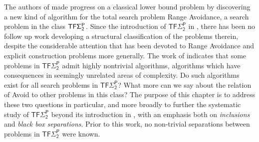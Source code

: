 The authors of \cite{CHR,Li} made progress on a classical lower bound problem by discovering a new kind of algorithm for the total search problem Range Avoidance, a search problem in the class $\cl{TF\Sigma_2^P}$.
Since the introduction of $\mathsf{TF\Sigma_2^P}$ in \cite{KKMP}, there has been no follow up work developing a structural classification of the problems therein, despite the considerable attention that has been devoted to Range Avoidance and explicit construction problems more generally. The work of \cite{CHR,Li} indicates that some problems in $ \mathsf{TF\Sigma_2^P}$ admit highly nontrivial algorithms, algorithms which have consequences in seemingly unrelated areas of complexity. Do such algorithms exist for all search problems in $\mathsf{TF\Sigma_2^P}$? What more can we say about the relation of Avoid to other problems in this class? The purpose of this chapter is to address these two questions in particular, and more broadly to further the systematic study of $\mathsf{TF\Sigma_2^P}$ beyond its introduction in \cite{KKMP}, with an emphasis both on \emph{inclusions} and \emph{black box separations}. Prior to this work, no non-trivial separations between problems in $\mathsf{TF\Sigma_2^P}$ were known.

